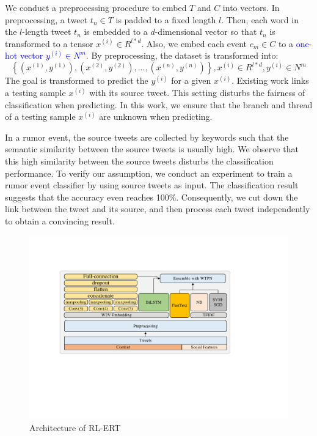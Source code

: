 \documentclass[review]{elsarticle}
\begin{document}
We conduct a preprocessing procedure to embed $T$ and $C$ into vectors. In preprocessing, a tweet $t_n \in T $ is padded to a fixed length $l$. Then, each word in the $l$-length tweet $t_n$ is embedded to a $d$-dimensional vector so that $t_n$ is transformed to a tensor $x^{(i)} \in R^{l*d}$. Also, we embed each event $c_m \in C$ to a \textcolor{blue}{one-hot vector $y^{(i)} \in N^m$}. By preprocessing, the dataset is transformed into: $$\left\{ (x^{(1)}, y^{(1)}), (x^{(2)}, y^{(2)}),..., (x^{(n)}, y^{(n)}) \right\}, x^{(i)} \in R^{l*d}, y^{(i)} \in N^m $$ The goal is transformed to predict the $y^{(i)}$ for a given $x^{(i)}$. Existing work \cite{DBLP:conf/www/ChengNB20} links a testing sample $x^{(i)}$ with its source tweet. This setting disturbs the fairness of classification when predicting. In this work, we ensure that the branch and thread of a testing sample $x^{(i)}$ are unknown when predicting.

In a rumor event, the source tweets are collected by keywords such that the semantic similarity between the source tweets is usually high. We observe that this high similarity between the source tweets disturbs the classification performance. To verify our assumption, we conduct an experiment to train a rumor event classifier by using source tweets as input. The classification result suggests that the accuracy even reaches 100\%. Consequently, we cut down the link between the tweet and its source, and then process each tweet independently to obtain a convincing result.

\begin{figure}[htbp]
	\hspace{0ex}
	\vspace{0ex}
	\centering
	\includegraphics[width = \textwidth]{structure}
	\caption{Architecture of RL-ERT}
	\label{fig:architecture}
\end{figure} 
\end{document}

